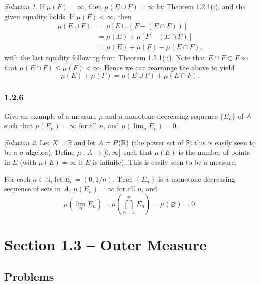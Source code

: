 \documentclass{report}
\newcommand{\bb}[1]{\mathbb{#1}}
\let\cal\relax
\newcommand{\cal}[1]{\mathcal{#1}}
\theoremstyle{remark}
\newtheorem*{solution}{Solution}
\begin{document}
\begin{solution}
  If $\mu(F) = \infty$, then $\mu(E \cup F) = \infty$ by Theorem 1.2.1(i), and the given equality holds. If $\mu(F) < \infty$, then
  \begin{equation*}
    \begin{split}
      \mu(E \cup F) &= \mu[E \cup (F - (E \cap F))] \\
      &= \mu(E) + \mu[F - (E \cap F)] \\
      &= \mu(E) + \mu(F) - \mu(E \cap F),
    \end{split}
  \end{equation*}
  with the last equality following from Theorem 1.2.1(ii). Note that $E \cap F \subset F$ so that $\mu(E \cap F) \le \mu(F) < \infty$. Hence we can rearrange the above to yield
  \begin{equation*}
    \mu(E) + \mu(F) = \mu(E \cup F) + \mu(E \cap F).
  \end{equation*}
\end{solution}

\subsubsection*{1.2.6}
Give an example of a measure $\mu$ and a monotone-decreasing sequence $\{E_n\}$ of $\cal A$ such that $\mu(E_n) = \infty$ for all $n$, and $\mu(\lim_n E_n) = 0$.

\begin{solution}
  Let $X = \bb R$ and let $\cal A = \cal P(\bb R)$ (the power set of $\bb R$; this is easily seen to be a $\sigma$-algebra). Define $\mu: \cal A \to [0,\infty]$ such that $\mu(E)$ is the number of points in $E$ (with $\mu(E) = \infty$ if $E$ is infinite). This is easily seen to be a measure.

  For each $n \in \bb N$, let $E_n = (0, 1/n)$. Then $(E_n)$ is a monotone decreasing sequence of sets in $\cal A$, $\mu(E_n) = \infty$ for all $n$, and
  \begin{equation*}
    \mu \left( \lim_n E_n \right) = \mu \left( \bigcap_{n=1}^\infty E_n \right) = \mu(\varnothing) = 0.
  \end{equation*}
\end{solution}

\section*{Section 1.3 -- Outer Measure}

\subsection*{Problems}
\end{document}
